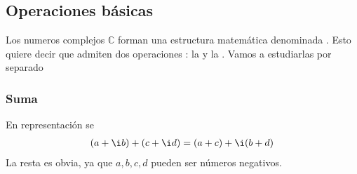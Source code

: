 \documentclass[letterpaper,10pt,english]{jupyterBook}
\begin{document}
\subsection{Operaciones básicas}
\label{\detokenize{docs/Part_01_Formalismo/Chapter_01_02_Formalismo_matem_xe1tico/01_01_Numeros_Complejos_myst:operaciones-basicas}}
\sphinxAtStartPar
Los numeros complejos \({\mathbb C}\) forman una estructura matemática denominada . Esto  quiere decir que admiten dos operaciones : la  y la . Vamos a estudiarlas por separado


\subsubsection{Suma}
\label{\detokenize{docs/Part_01_Formalismo/Chapter_01_02_Formalismo_matem_xe1tico/01_01_Numeros_Complejos_myst:suma}}
\sphinxAtStartPar
En representación  se 
\begin{equation*}
\begin{split}
(a + \i b) + (c + \i d) = (a+c) + \i (b+d)
\end{split}
\end{equation*}
\sphinxAtStartPar
La resta es obvia, ya que \(a,b,c,d\) pueden ser números negativos.
\end{document}
